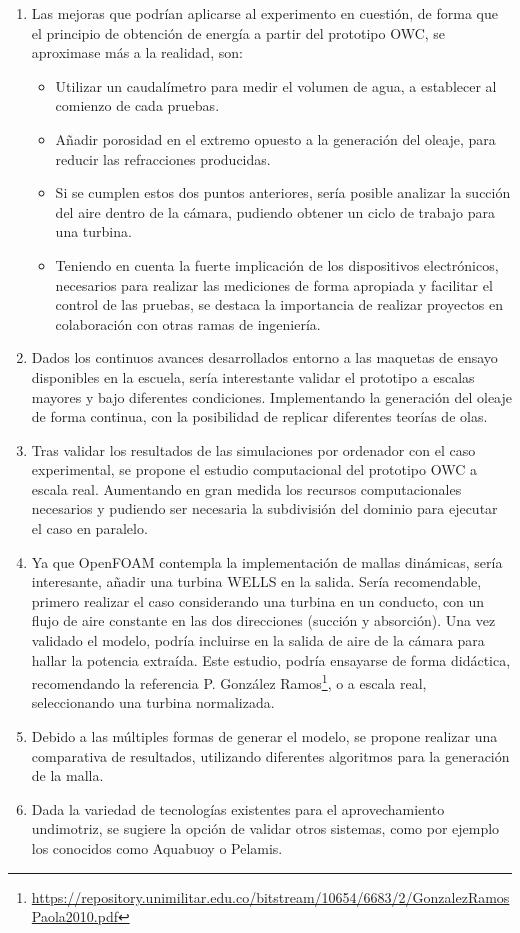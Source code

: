 \begin{enumerate}
\def\labelenumi{\arabic{enumi}.}
\item
  Las mejoras que podrían aplicarse al experimento en cuestión, de forma
  que el principio de obtención de energía a partir del prototipo OWC,
  se aproximase más a la realidad, son:

  \begin{itemize}
  \item
    Utilizar un caudalímetro para medir el volumen de agua, a establecer
    al comienzo de cada pruebas.
  \item
    Añadir porosidad en el extremo opuesto a la generación del oleaje,
    para reducir las refracciones producidas.
  \item
    Si se cumplen estos dos puntos anteriores, sería posible analizar la
    succión del aire dentro de la cámara, pudiendo obtener un ciclo de
    trabajo para una turbina.
  \item
    Teniendo en cuenta la fuerte implicación de los dispositivos
    electrónicos, necesarios para realizar las mediciones de forma
    apropiada y facilitar el control de las pruebas, se destaca la
    importancia de realizar proyectos en colaboración con otras ramas de
    ingeniería.
  \end{itemize}
\item
  Dados los continuos avances desarrollados entorno a las maquetas de
  ensayo disponibles en la escuela, sería interestante validar el
  prototipo a escalas mayores y bajo diferentes condiciones.
  Implementando la generación del oleaje de forma continua, con la
  posibilidad de replicar diferentes teorías de olas.
\item
  Tras validar los resultados de las simulaciones por ordenador con el
  caso experimental, se propone el estudio computacional del prototipo
  OWC a escala real. Aumentando en gran medida los recursos
  computacionales necesarios y pudiendo ser necesaria la subdivisión del
  dominio para ejecutar el caso en paralelo.
\item
  Ya que OpenFOAM contempla la implementación de mallas dinámicas, sería
  interesante, añadir una turbina WELLS en la salida. Sería
  recomendable, primero realizar el caso considerando una turbina en un
  conducto, con un flujo de aire constante en las dos direcciones
  (succión y absorción). Una vez validado el modelo, podría incluirse en
  la salida de aire de la cámara para hallar la potencia extraída. Este
  estudio, podría ensayarse de forma didáctica, recomendando la
  referencia P.
  González Ramos\footnote{\url{https://repository.unimilitar.edu.co/bitstream/10654/6683/2/GonzalezRamosPaola2010.pdf}}, o a escala real, seleccionando una turbina
  normalizada.
\item
  Debido a las múltiples formas de generar el modelo, se propone
  realizar una comparativa de resultados, utilizando diferentes
  algoritmos para la generación de la malla.
\item
  Dada la variedad de tecnologías existentes para el aprovechamiento
  undimotriz, se sugiere la opción de validar otros sistemas, como por
  ejemplo los conocidos como Aquabuoy o Pelamis.
\end{enumerate}
